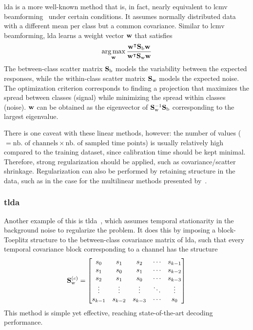 \Ac{lda} is a more well-known method that is, in fact, nearly equivalent to
\ac{lcmv} beamforming~\cite{Treder2016} under certain conditions.
It assumes normally distributed data with a different mean per class but a common
covariance.
Similar to \ac{lcmv} beamforming, \ac{lda} learns a weight vector $\mathbf{w}$ that
satisfies
\begin{equation}
  \operatorname*{arg\,max}_{\mathbf{w}}\frac{\mathbf{w}^\intercal\mathbf{S}_\text{b}\mathbf{w}}{\mathbf{w}^\intercal\mathbf{S}_\text{w}\mathbf{w}}
\end{equation}
The between-class scatter matrix $\mathbf{S}_\text{b}$ models the variability between the
expected responses, while the within-class scatter matrix $\mathbf{S}_\text{w}$ models the
expected noise.
The optimization criterion corresponds to finding a projection that maximizes the spread
between classes (signal) while minimizing the spread within classes (noise).
$\mathbf{w}$ can be obtained as the eigenvector of
$\mathbf{S}_\text{w}^{-1}\mathbf{S}_\text{b}$ corresponding to the largest eigenvalue.

There is one caveat with these linear methods, however:
the number of values ($=\text{nb. of channels}\times\text{nb. of sampled time points}$)
is usually relatively high compared to the training dataset, since calibration time
should be kept minimal.
Therefore, strong regularization should be applied, such as covariance/scatter
shrinkage.
Regularization can also be performed by retaining structure in the data, such as in the
case for the multilinear methods presented by~\textcite{Lotte2018}.

\subsubsection{\Acf{tlda}}

Another example of this is \ac{tlda}~\cite{Sosulski2022}, which assumes temporal
stationarity in the background noise to regularize the problem.
It does this by imposing a block-Toeplitz structure to the between-class covariance
matrix of \ac{lda}, such that every temporal covariance block corresponding to a channel
has the structure
\begin{equation}
  \mathbf{S}_\text{w}^{(c)} = \begin{bmatrix}
s_0 & s_1 & s_2 & \cdots & s_{k-1} \\
s_1 & s_0 & s_1 & \cdots & s_{k-2} \\
s_2 & s_1 & s_0 & \cdots & s_{k-3} \\
\vdots & \vdots & \vdots & \ddots & \vdots \\
s_{k-1} & s_{k-2} & s_{k-3} & \cdots & s_0
\end{bmatrix}
\end{equation}
This method is simple yet effective, reaching state-of-the-art decoding performance.

